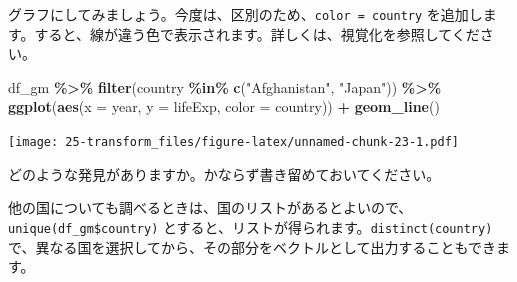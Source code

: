 \documentclass[
  xelatex, ja=standard]{bxjsbook}
\newenvironment{Shaded}{\begin{snugshade}}{\end{snugshade}}
\newcommand{\AttributeTok}[1]{\textcolor[rgb]{0.13,0.29,0.53}{#1}}
\newcommand{\FunctionTok}[1]{\textcolor[rgb]{0.13,0.29,0.53}{\textbf{#1}}}
\newcommand{\NormalTok}[1]{#1}
\newcommand{\SpecialCharTok}[1]{\textcolor[rgb]{0.81,0.36,0.00}{\textbf{#1}}}
\newcommand{\StringTok}[1]{\textcolor[rgb]{0.31,0.60,0.02}{#1}}
\theoremstyle{definition}
\theoremstyle{definition}
\theoremstyle{definition}
\theoremstyle{definition}
\theoremstyle{remark}
\begin{document}
グラフにしてみましょう。今度は、区別のため、\texttt{color\ =\ country} を追加します。すると、線が違う色で表示されます。詳しくは、視覚化を参照してください。

\begin{Shaded}
\begin{Highlighting}[]
\NormalTok{df\_gm }\SpecialCharTok{\%\textgreater{}\%} \FunctionTok{filter}\NormalTok{(country }\SpecialCharTok{\%in\%} \FunctionTok{c}\NormalTok{(}\StringTok{"Afghanistan"}\NormalTok{, }\StringTok{"Japan"}\NormalTok{)) }\SpecialCharTok{\%\textgreater{}\%}
  \FunctionTok{ggplot}\NormalTok{(}\FunctionTok{aes}\NormalTok{(}\AttributeTok{x =}\NormalTok{ year, }\AttributeTok{y =}\NormalTok{ lifeExp, }\AttributeTok{color =}\NormalTok{ country)) }\SpecialCharTok{+} \FunctionTok{geom\_line}\NormalTok{()}
\end{Highlighting}
\end{Shaded}

\texttt{[image: 25-transform\_files/figure-latex/unnamed-chunk-23-1.pdf]}

どのような発見がありますか。かならず書き留めておいてください。

他の国についても調べるときは、国のリストがあるとよいので、 \texttt{unique(df\_gm\$country)} とすると、リストが得られます。\texttt{distinct(country)} で、異なる国を選択してから、その部分をベクトルとして出力することもできます。
\end{document}
